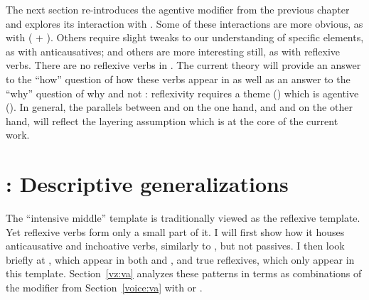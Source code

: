 \begin{exe}
\begin{xlist}
\begin{xlist}
\begin{exe}
\begin{xlist}
\begin{xlist}
\begin{exe}
\begin{xlist}
\begin{xlist}
\begin{exe}
\begin{exe}
\begin{xlist}
\begin{exe}
\begin{exe}
\begin{xlist}
\begin{exe}
\begin{exe}
\begin{exe}
\begin{exe}
\begin{exe}
\begin{xlist}
\begin{exe}
\begin{xlist}
\begin{exe}
\begin{exe}
\begin{xlist}
\begin{exe}
\begin{xlist}
\begin{exe}
\begin{xlist}
\begin{exe}
\begin{exe}
\begin{exe}
\begin{xlist}
\begin{exe}
\begin{exe}
\begin{exe}
\begin{xlist}
\begin{exe}
\begin{xlist}
\begin{exe}
\begin{exe}
\begin{xlist}
\begin{exe}
\begin{exe}
\begin{exe}
\begin{exe}
\begin{xlist}
\begin{exe}
\begin{xlist}
\begin{exe}
\begin{xlist}
\begin{exe}
\begin{xlist}
\begin{exe}
\begin{xlist}
\begin{exe}
\begin{xlist}
\begin{exe}
\begin{exe}
\begin{xlist}
\begin{exe}
\begin{xlist}
\begin{exe}
\begin{exe}
\begin{xlist}
The next section re-introduces the agentive modifier {\va} from the previous chapter and explores its interaction with {\vz}. Some of these interactions are more obvious, as with  ({\va} + {\pz}). Others require slight tweaks to our understanding of specific elements, as with anticausatives; and others are more interesting still, as with reflexive verbs. There are no reflexive verbs in {\tnif}. The current theory will provide an answer to the ``how'' question of how these verbs appear in {\thit} as well as an answer to the ``why'' question of why {\thit} and not {\tnif}: reflexivity requires a theme (\vz) which is agentive (\va). In general, the parallels between {\tkal} and {\thif} on the one hand, and {\tpie} and {\thit} on the other hand, will reflect the layering assumption which is at the core of the current work. 


\section{\thit: Descriptive generalizations} \label{vz:thit}
The ``intensive middle'' template {\thit} is traditionally viewed as the reflexive template. Yet reflexive verbs form only a small part of it. I will first show how it houses anticausative and inchoative verbs, similarly to {\tnif}, but not passives. I then look briefly at , which appear in both {\tnif} and {\thit}, and true reflexives, which only appear in this template. Section~\ref{vz:va} analyzes these patterns in terms as combinations of the modifier {\va} from Section~\ref{voice:va} with {\vz} or {\pz}.


\end{xlist}
\end{exe}
\end{exe}
\end{xlist}
\end{exe}
\end{xlist}
\end{exe}
\end{exe}
\end{xlist}
\end{exe}
\end{xlist}
\end{exe}
\end{xlist}
\end{exe}
\end{xlist}
\end{exe}
\end{xlist}
\end{exe}
\end{xlist}
\end{exe}
\end{exe}
\end{exe}
\end{exe}
\end{xlist}
\end{exe}
\end{exe}
\end{xlist}
\end{exe}
\end{xlist}
\end{exe}
\end{exe}
\end{exe}
\end{xlist}
\end{exe}
\end{exe}
\end{exe}
\end{xlist}
\end{exe}
\end{xlist}
\end{exe}
\end{xlist}
\end{exe}
\end{exe}
\end{xlist}
\end{exe}
\end{xlist}
\end{exe}
\end{exe}
\end{exe}
\end{exe}
\end{exe}
\end{xlist}
\end{exe}
\end{exe}
\end{xlist}
\end{exe}
\end{exe}
\end{xlist}
\end{xlist}
\end{exe}
\end{xlist}
\end{xlist}
\end{exe}
\end{xlist}
\end{xlist}
\end{exe}
